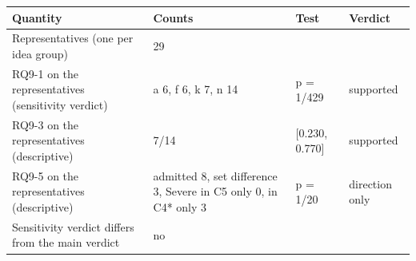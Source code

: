 \begin{tabular}{llll}
\toprule
Quantity & Counts & Test & Verdict \\
\midrule
Representatives (one per idea group) & 29 &  &  \\
RQ9-1 on the representatives (sensitivity verdict) & a 6, f 6, k 7, n 14 & p = 1/429 & supported \\
RQ9-3 on the representatives (descriptive) & 7/14 & [0.230, 0.770] & supported \\
RQ9-5 on the representatives (descriptive) & admitted 8, set difference 3, Severe in C5 only 0, in C4* only 3 & p = 1/20 & direction only \\
Sensitivity verdict differs from the main verdict & no &  &  \\
\bottomrule
\end{tabular}
